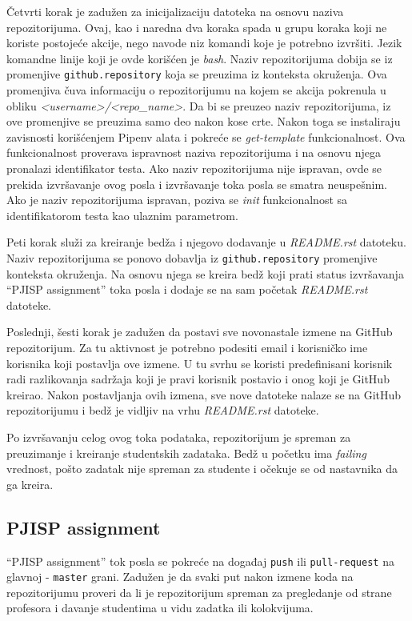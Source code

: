 \documentclass[12pt]{report}
\begin{document}
Četvrti korak je zadužen za inicijalizaciju datoteka na osnovu naziva repozitorijuma. Ovaj, kao i naredna dva koraka spada u grupu koraka koji ne koriste postojeće akcije, nego navode niz komandi koje je potrebno izvršiti. Jezik komandne linije koji je ovde korišćen je \textit{bash}. Naziv repozitorijuma dobija se iz promenjive \texttt{github.repository} koja se preuzima iz konteksta okruženja. Ova promenjiva čuva informaciju o repozitorijumu na kojem se akcija pokrenula u obliku \textit{<username>/<repo\_name>}. Da bi se preuzeo naziv repozitorijuma, iz ove promenjive se preuzima samo deo nakon kose crte. Nakon toga se instaliraju zavisnosti korišćenjem Pipenv alata i pokreće se \textit{get-template} funkcionalnost. Ova funkcionalnost proverava ispravnost naziva repozitorijuma i na osnovu njega pronalazi identifikator testa. Ako naziv repozitorijuma nije ispravan, ovde se prekida izvršavanje ovog posla i izvršavanje toka posla se smatra neuspešnim. Ako je naziv repozitorijuma ispravan, poziva se \textit{init} funkcionalnost sa identifikatorom testa kao ulaznim parametrom.

Peti korak služi za kreiranje bedža i njegovo dodavanje u \textit{README.rst} datoteku. Naziv repozitorijuma se ponovo dobavlja iz \texttt{github.repository} promenjive konteksta okruženja. Na osnovu njega se kreira bedž koji prati status izvršavanja ``PJISP assignment'' toka posla i dodaje se na sam početak \textit{README.rst} datoteke.

Poslednji, šesti korak je zadužen da postavi sve novonastale izmene na GitHub repozitorijum. Za tu aktivnost je potrebno podesiti email i korisničko ime korisnika koji postavlja ove izmene. U tu svrhu se koristi predefinisani korisnik radi razlikovanja sadržaja koji je pravi korisnik postavio i onog koji je GitHub kreirao. Nakon postavljanja ovih izmena, sve nove datoteke nalaze se na GitHub repozitorijumu i bedž je vidljiv na vrhu \textit{README.rst} datoteke.

Po izvršavanju celog ovog toka podataka, repozitorijum je spreman za preuzimanje i kreiranje studentskih zadataka. Bedž u početku ima \textit{failing} vrednost, pošto zadatak nije spreman za studente i očekuje se od nastavnika da ga kreira.

\subsection{PJISP assignment}
``PJISP assignment'' tok posla se pokreće na događaj \texttt{push} ili \texttt{pull-request} na glavnoj - \texttt{master} grani. Zadužen je da svaki put nakon izmene koda na repozitorijumu proveri da li je repozitorijum spreman za pregledanje od strane profesora i davanje studentima u vidu zadatka ili kolokvijuma.
\end{document}
